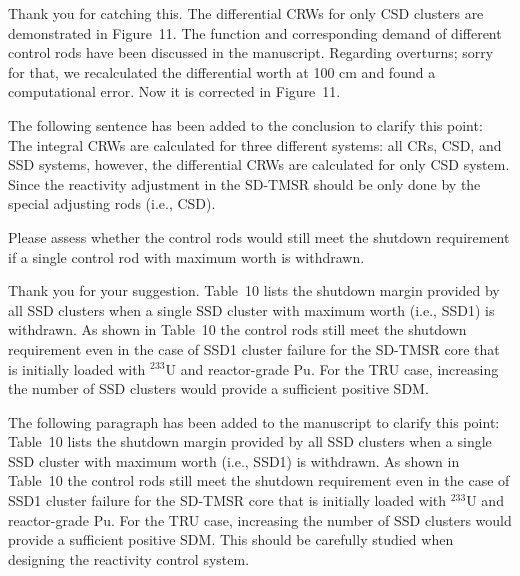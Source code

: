\documentclass[answers,11pt]{exam}
\begin{document}
\begin{questions}
\begin{solution}
	Thank you for catching this. The differential CRWs for only CSD clusters are demonstrated in Figure~11. The function and corresponding demand of different control rods have been discussed in the manuscript. Regarding overturns; sorry for that, we recalculated the differential worth at 100 cm and found a computational error. Now it is corrected in Figure~11. 	
	
	The following sentence has been added to the conclusion to clarify this point:\\
	
	The integral CRWs are calculated for three different systems: all CRs, CSD, and SSD systems, however, the differential CRWs are calculated for only CSD system. Since the reactivity adjustment in the SD-TMSR should be only done by the special adjusting rods (i.e., CSD).
	
	
\end{solution}

\question Please assess whether the control rods would still meet the shutdown requirement if a single control rod with maximum worth is withdrawn.
\begin{solution}
	
	Thank you for your suggestion. Table~10 lists the shutdown margin provided by all SSD clusters when a single SSD cluster with maximum worth (i.e., SSD1) is withdrawn. As shown in Table~10 the control rods still meet the shutdown requirement even in the case of SSD1 cluster failure for the SD-TMSR core that is initially loaded with $^{233}$U and reactor-grade Pu. For the TRU case, increasing the number of SSD clusters would provide a sufficient positive SDM.
	
		The following paragraph has been added to the manuscript to clarify this point:\\
	
	Table~10 lists the shutdown margin provided by all SSD clusters when a single SSD cluster with maximum worth (i.e., SSD1) is withdrawn. As shown in Table~10 the control rods still meet the shutdown requirement even in the case of SSD1 cluster failure for the SD-TMSR core that is initially loaded with $^{233}$U and reactor-grade Pu. For the TRU case, increasing the number of SSD clusters would provide a sufficient positive SDM. This should be carefully studied when designing the reactivity control system. 
	
	
\end{solution}


\end{questions}
\end{document}
